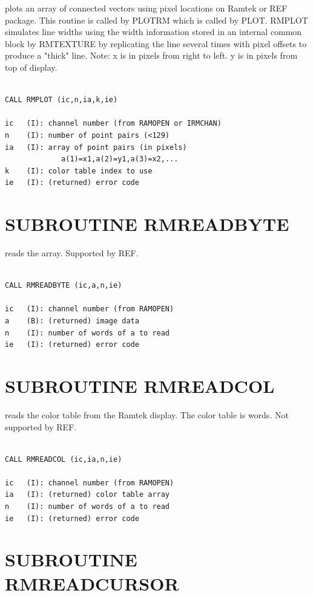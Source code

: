 \documentclass[11pt]{report}
\begin{document}
 plots an array of connected vectors using pixel locations on Ramtek
or REF package.  This routine is called by PLOTRM which is called by PLOT.
RMPLOT simulates line widths using the width information stored in an
internal common block by RMTEXTURE by replicating the line several times
with pixel offsets to produce a "thick" line.
Note: x is in pixels from right to left.  y is in pixels from top of display.
 
\begin{verbatim}

CALL RMPLOT (ic,n,ia,k,ie)

ic   (I): channel number (from RAMOPEN or IRMCHAN)
n    (I): number of point pairs (<129)
ia   (I): array of point pairs (in pixels)
             a(1)=x1,a(2)=y1,a(3)=x2,...
k    (I): color table index to use
ie   (I): (returned) error code
\end{verbatim}

\section{SUBROUTINE RMREADBYTE}

 reads the   array.  Supported by REF.
\begin{verbatim}

CALL RMREADBYTE (ic,a,n,ie)

ic   (I): channel number (from RAMOPEN)
a    (B): (returned) image data
n    (I): number of words of a to read
ie   (I): (returned) error code
\end{verbatim}

\section{SUBROUTINE  RMREADCOL}

 reads the  color table from the Ramtek display.
The color table is  words.
Not supported by REF.
\begin{verbatim}

CALL RMREADCOL (ic,ia,n,ie)

ic   (I): channel number (from RAMOPEN)
ia   (I): (returned) color table array
n    (I): number of words of a to read
ie   (I): (returned) error code
\end{verbatim}

\section{SUBROUTINE RMREADCURSOR}
\end{document}
